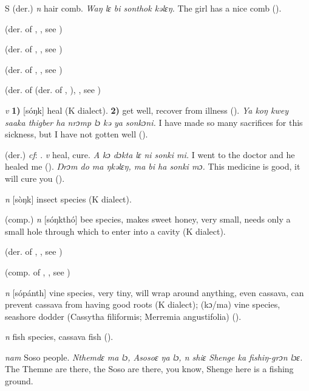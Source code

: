 \begin{letter}{S}
 (der.) \textit{n} hair comb. \textit{Waŋ lɛ bi sonthok kəlɛŋ.} The girl has a nice comb (\citealt{Pichl1967}). 

 (der. of , , see ) 

 (der. of , , see ) 

 (der. of , , see )

 (der. of  (der. of , ), , see ) 

 \textit{v} \textbf{1)} [sóŋk] heal (K dialect). \textbf{2)} get well, recover from illness (\citealt{Pichl1967}). \textit{Ya koŋ kwey saaka thigber ha nrɔmp lɔ kə ya sonkɔni.} I have made so many sacrifices for this sickness, but I have not gotten well (\citealt{Pichl1967}).

 (der.) \textit{cf}: . \textit{v} heal, cure. \textit{A kɔ dɔkta lɛ ni sonki mi.} I went to the doctor and he healed me (\citealt{Pichl1967}). \textit{Ŋrɔm do ma ŋkəlɛŋ, ma bi ha sonki mɔ.} This medicine is good, it will cure you (\citealt{Pichl1967}). 

 \textit{n} [sòŋk] insect species (K dialect). 

 (comp.) \textit{n} [sóŋkthó] bee species, makes sweet honey, very small, needs only a small hole through which to enter into a cavity (K dialect). 

 (der. of , , see ) 

 (comp. of , , see ) 

 \textit{n} [sópánth] vine species, very tiny, will wrap around anything, even cassava, can prevent cassava from having good roots (K dialect); (kɔ/ma) vine species, seashore dodder (Cassytha filiformis; Merremia angustifolia) (\citealt{Pichl1967}). 

 \textit{n} fish species, cassava fish (\citealt{Pichl1967}).

 \textit{nam} Soso people. \textit{Nthemdɛ ma lɔ, Asosoɛ ŋa lɔ, n shiɛ Shenge ka fishiŋ-grɔn lɔɛ.} The Themne are there, the Soso are there, you know, Shenge here is a fishing ground.


\end{letter}
